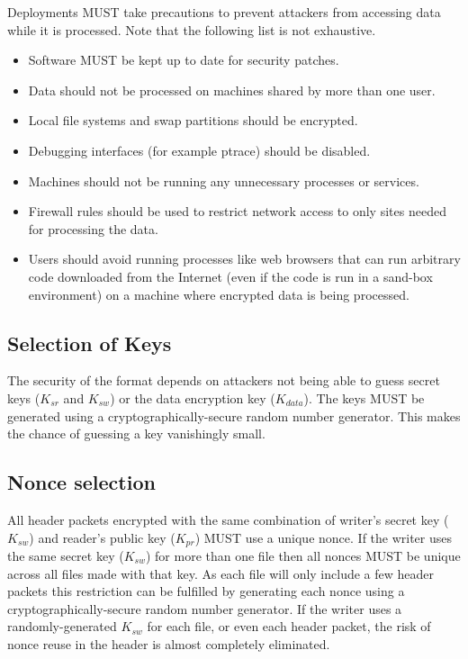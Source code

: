 \documentclass[10pt]{article}
\begin{document}
Deployments MUST take precautions to prevent attackers from accessing data while it is processed.
Note that the following list is not exhaustive.
\begin{itemize}
\item Software MUST be kept up to date for security patches.
\item Data should not be processed on machines shared by more than one user.
\item Local file systems and swap partitions should be encrypted.
\item Debugging interfaces (for example ptrace) should be disabled.
\item Machines should not be running any unnecessary processes or services.
\item Firewall rules should be used to restrict network access to only sites needed for processing the data.
\item Users should avoid running processes like web browsers that can run arbitrary code downloaded from the Internet
(even if the code is run in a sand-box environment) on a machine where encrypted data is being processed.
\end{itemize}

\subsection{Selection of Keys}
The security of the format depends on attackers not being able to guess secret keys ($K_{sr}$ and $K_{sw}$)
or the data encryption key ($K_{data}$).
The keys MUST be generated using a cryptographically-secure random number generator.
This makes the chance of guessing a key vanishingly small.

\subsection{Nonce selection}
All header packets encrypted with the same combination of writer's secret key ($K_{sw}$)
and reader's public key ($K_{pr}$) MUST use a unique nonce.
If the writer uses the same secret key ($K_{sw}$) for more than one file then all nonces MUST be unique across all
files made with that key.
As each file will only include a few header packets this restriction can be fulfilled by generating each nonce
using a cryptographically-secure random number generator.
If the writer uses a randomly-generated $K_{sw}$ for each file, or even each header packet, the risk of nonce reuse in
the header is almost completely eliminated.
\end{document}
